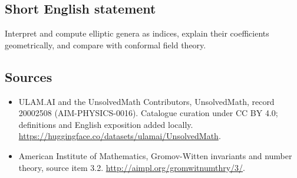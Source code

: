 \documentclass[11pt]{article}
\begin{document}
\subsection{Short English statement}
Interpret and compute elliptic genera as indices, explain their coefficients geometrically, and compare with conformal field theory.
\subsection{Sources}
\begin{itemize}
\item[\hypertarget{source:20002508:1}{S1}] ULAM.AI and the UnsolvedMath Contributors, UnsolvedMath, record 20002508 (AIM-PHYSICS-0016). Catalogue curation under CC BY 4.0; definitions and English exposition added locally.
\url{https://huggingface.co/datasets/ulamai/UnsolvedMath}.
\item[\hypertarget{source:20002508:2}{S2}] American Institute of Mathematics, Gromov-Witten invariants and number theory, source item 3.2.
\url{http://aimpl.org/gromwitnumthry/3/}.
\end{itemize}
\label{end:20002508}
\end{document}

